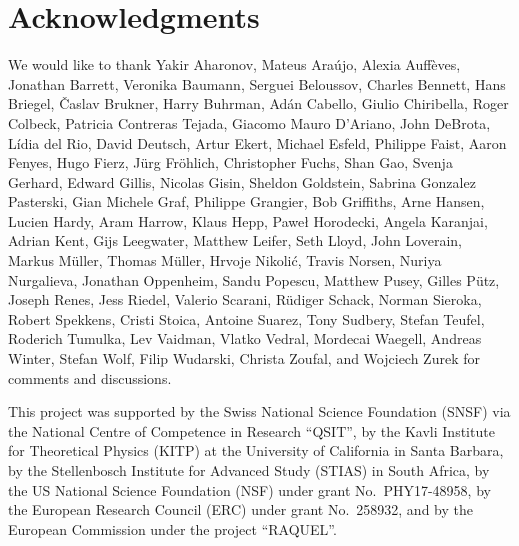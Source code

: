 \documentclass[12pt]{article}
\theoremstyle{mystyle}
\theoremstyle{definition}
\begin{document}
\section*{Acknowledgments}

We would like to thank Yakir Aharonov, Mateus Ara\'ujo, Alexia Auff\`eves, Jonathan Barrett, Veronika Baumann, Serguei Beloussov, Charles Bennett, Hans Briegel, \v{C}aslav Brukner, Harry Buhrman, Ad\'an Cabello, Giulio Chiribella, Roger Colbeck, Patricia Contreras Tejada, Giacomo Mauro D'Ariano,  John DeBrota, L\'idia del Rio, David Deutsch, Artur Ekert, Michael Esfeld, Philippe Faist, Aaron Fenyes, Hugo Fierz, J\"urg Fr\"ohlich, Christopher Fuchs, Shan Gao, Svenja Gerhard, Edward Gillis, Nicolas Gisin,  Sheldon Goldstein, Sabrina Gonzalez Pasterski, Gian Michele Graf, Philippe Grangier, Bob Griffiths,  Arne Hansen, Lucien Hardy, Aram Harrow, Klaus Hepp, Pawe\l{} Horodecki, Angela Karanjai, Adrian Kent, Gijs Leegwater, Matthew Leifer, Seth Lloyd, John Loverain, Markus M\"uller, Thomas M\"uller, Hrvoje Nikoli\'c, Travis Norsen, Nuriya Nurgalieva, Jonathan Oppenheim, Sandu Popescu, Matthew Pusey, Gilles P\"utz, Joseph Renes, Jess Riedel, Valerio Scarani, R\"udiger Schack, Norman Sieroka, Robert Spekkens, Cristi Stoica, Antoine Suarez, Tony Sudbery, Stefan Teufel, Roderich Tumulka, Lev Vaidman, Vlatko Vedral, Mordecai Waegell, Andreas Winter, Stefan Wolf, Filip Wudarski,  Christa Zoufal, and Wojciech Zurek for comments and discussions.

This project was supported by the Swiss National Science Foundation (SNSF) via the National Centre of Competence in Research ``QSIT'', by the Kavli Institute for Theoretical Physics (KITP) at the University of California in Santa Barbara, by the Stellenbosch Institute for Advanced Study (STIAS) in South Africa,  by the US National Science Foundation (NSF) under grant No.\ PHY17-48958, by the European Research Council (ERC) under grant No.\ 258932,  and by the European Commission under the project ``RAQUEL''.  



\end{document}
